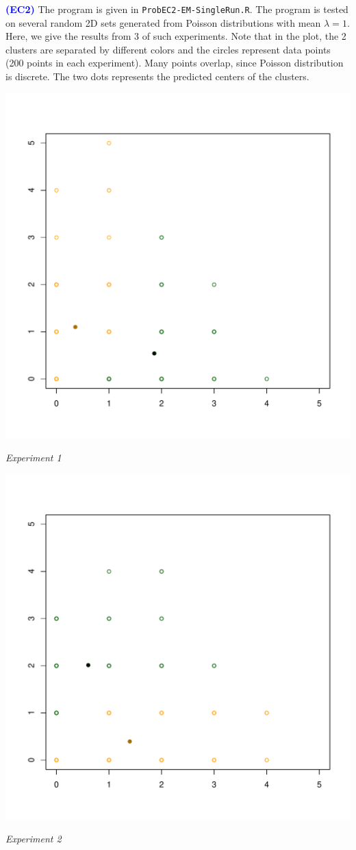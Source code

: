 \documentclass[a4paper,12pt]{article}
\newcommand{\code}[1]{\texttt{#1}}
\newcommand{\qnum}[1]{\noindent\textcolor{blue}{\textbf{(#1)}}}
\begin{document}
\qnum{EC2}
The program is given in \code{ProbEC2-EM-SingleRun.R}. The program is tested on several random 2D sets generated from Poisson distributions with mean $\lambda = 1$. Here, we give the results from 3 of such experiments. 
Note that in the plot, the 2 clusters are separated by different colors and the circles represent data points (200 points in each experiment). Many points overlap, since Poisson distribution is discrete. The two dots represents the predicted centers of the clusters.


\begin{center}
  \includegraphics[width=0.6\linewidth]{Image/ProbEC2-1.pdf}
  
 \small{\textit{Experiment 1}}
\end{center}


\begin{center}
  \includegraphics[width=0.6\linewidth]{Image/ProbEC2-2.pdf}
  
  \small\textit{Experiment 2}
\end{center}
\end{document}
